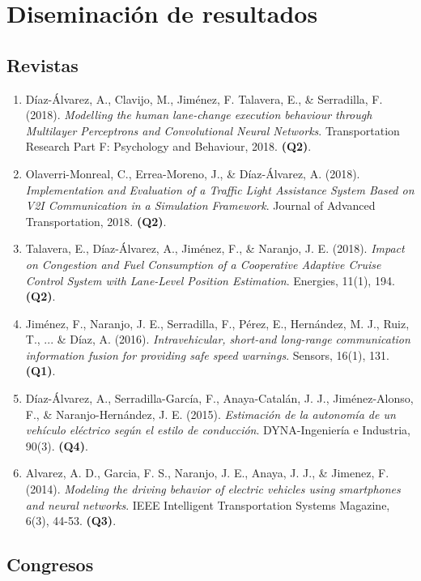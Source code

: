 \chapter{Diseminación de resultados}
\label{ch:future-work}

\section{Revistas}

\begin{enumerate}
	\item Díaz-Álvarez, A., Clavijo, M., Jiménez, F. Talavera, E., \& Serradilla, F. (2018). \textit{Modelling the human lane-change execution behaviour through Multilayer Perceptrons and Convolutional Neural Networks}. Transportation Research Part F: Psychology and Behaviour, 2018. \textbf{(Q2)}.
	\item Olaverri-Monreal, C., Errea-Moreno, J., \& Díaz-Álvarez, A. (2018). \textit{Implementation and Evaluation of a Traffic Light Assistance System Based on V2I Communication in a Simulation Framework}. Journal of Advanced Transportation, 2018. \textbf{(Q2)}.
	\item Talavera, E., Díaz-Álvarez, A., Jiménez, F., \& Naranjo, J. E. (2018). \textit{Impact on Congestion and Fuel Consumption of a Cooperative Adaptive Cruise Control System with Lane-Level Position Estimation}. Energies, 11(1), 194. \textbf{(Q2)}.
	\item Jiménez, F., Naranjo, J. E., Serradilla, F., Pérez, E., Hernández, M. J., Ruiz, T., ... \& Díaz, A. (2016). \textit{Intravehicular, short-and long-range communication information fusion for providing safe speed warnings}. Sensors, 16(1), 131. \textbf{(Q1)}.
	\item Díaz-Álvarez, A., Serradilla-García, F., Anaya-Catalán, J. J., Jiménez-Alonso, F., \& Naranjo-Hernández, J. E. (2015). \textit{Estimación de la autonomía de un vehículo eléctrico según el estilo de conducción}. DYNA-Ingeniería e Industria, 90(3). \textbf{(Q4)}.
	\item Alvarez, A. D., Garcia, F. S., Naranjo, J. E., Anaya, J. J., \& Jimenez, F. (2014). \textit{Modeling the driving behavior of electric vehicles using smartphones and neural networks}. IEEE Intelligent Transportation Systems Magazine, 6(3), 44-53. \textbf{(Q3)}.
\end{enumerate}

\section{Congresos}

